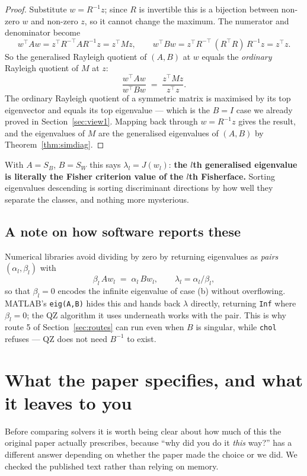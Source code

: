 \documentclass[11pt]{article}
\theoremstyle{definition}
\theoremstyle{remark}
\newcommand{\Sw}{S_W}
\newcommand{\Sb}{S_B}
\begin{document}
\begin{proof}
Substitute $w = R^{-1}z$; since $R$ is invertible this is a bijection between
non-zero $w$ and non-zero $z$, so it cannot change the maximum. The numerator and
denominator become
\[
  w^{\!\top}Aw = z^{\!\top}R^{-\top}AR^{-1}z = z^{\!\top}Mz,
  \qquad
  w^{\!\top}Bw = z^{\!\top}R^{-\top}\,(R^{\!\top}R)\,R^{-1}z = z^{\!\top}z .
\]
So the generalised Rayleigh quotient of $(A,B)$ at $w$ equals the \emph{ordinary}
Rayleigh quotient of $M$ at $z$:
\[
  \frac{w^{\!\top}Aw}{w^{\!\top}Bw} \;=\; \frac{z^{\!\top}Mz}{z^{\!\top}z}.
\]
The ordinary Rayleigh quotient of a symmetric matrix is maximised by its top
eigenvector and equals its top eigenvalue --- which is the $B=I$ case we already
proved in Section~\ref{sec:view1}. Mapping back through $w = R^{-1}z$ gives the
result, and the eigenvalues of $M$ are the generalised eigenvalues of $(A,B)$ by
Theorem~\ref{thm:simdiag}.
\end{proof}

With $A=\Sb$, $B=\Sw$ this says $\lambda_l = J(w_l)$: \textbf{the $l$th
generalised eigenvalue is literally the Fisher criterion value of the $l$th
Fisherface.} Sorting eigenvalues descending is sorting discriminant directions by
how well they separate the classes, and nothing more mysterious.

\subsection{A note on how software reports these}

Numerical libraries avoid dividing by zero by returning eigenvalues as
\emph{pairs} $(\alpha_l, \beta_l)$ with
\[
  \beta_l\, A w_l \;=\; \alpha_l\, B w_l , \qquad \lambda_l = \alpha_l/\beta_l ,
\]
so that $\beta_l = 0$ encodes the infinite eigenvalue of case (b) without
overflowing. MATLAB's \texttt{eig(A,B)} hides this and hands back $\lambda$
directly, returning \texttt{Inf} where $\beta_l=0$; the QZ algorithm it uses
underneath works with the pair. This is why route 5 of Section~\ref{sec:routes}
can run even when $B$ is singular, while \texttt{chol} refuses --- QZ does not
need $B^{-1}$ to exist.

\section{What the paper specifies, and what it leaves to you}
\label{sec:paperscope}

Before comparing solvers it is worth being clear about how much of this the
original paper actually prescribes, because ``why did you do it \emph{this}
way?'' has a different answer depending on whether the paper made the choice or
we did. We checked the published text rather than relying on memory.
\end{document}
